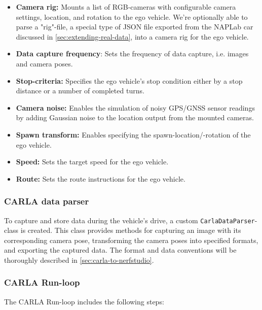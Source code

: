\begin{itemize}
    \item \textbf{Camera rig:} Mounts a list of RGB-cameras with configurable camera settings, location, and rotation to the ego vehicle. We're optionally able to parse a "rig"-file, a special type of JSON file exported from the NAPLab car discussed in \autoref{sec:extending-real-data}, into a camera rig for the ego vehicle. 
    \item \textbf{Data capture frequency}: Sets the frequency of data capture, i.e. images and camera poses.
    \item \textbf{Stop-criteria:} Specifies the ego vehicle's stop condition either by a stop distance or a number of completed turns.
    \item \textbf{Camera noise:} Enables the simulation of noisy GPS/GNSS sensor readings by adding Gaussian noise to the location output from the mounted cameras.
    \item \textbf{Spawn transform:} Enables specifying the spawn-location/-rotation of the ego vehicle.
    \item \textbf{Speed:} Sets the target speed for the ego vehicle.
    \item \textbf{Route:} Sets the route instructions for the ego vehicle.
\end{itemize}


\subsubsection{CARLA data parser}

To capture and store data during the vehicle’s drive, a custom \texttt{CarlaDataParser}-class is created. This class provides methods for capturing an image with its corresponding camera pose, transforming the camera poses into specified formats, and exporting the captured data. The format and data conventions will be thoroughly described in \autoref{sec:carla-to-nerfstudio}.

\subsubsection{CARLA Run-loop}
The CARLA Run-loop includes the following steps:

